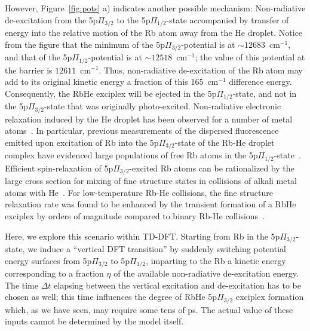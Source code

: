 However, Figure~\ref{fig:pots} a) indicates another possible mechanism: Non-radiative de-excitation from the 5p$\Pi_{3/2}$ to the 5p$\Pi_{1/2}$-state accompanied by transfer of energy into the relative motion of the Rb atom away from the He droplet. Notice from the figure that the minimum of the 5p$\Pi_{3/2}$-potential is at $\sim 12683$~cm$^{-1}$, and that of the 5p$\Pi_{1/2}$-potential is at $\sim 12518$~cm$^{-1}$; the value of this potential at the barrier is $12611$~cm$^{-1}$. Thus, non-radiative de-excitation of the Rb atom may add to its original kinetic energy a fraction of this 165~cm$^{-1}$ difference energy. Consequently, the RbHe exciplex will be ejected in the 5p$\Pi_{1/2}$-state, and not in the 5p$\Pi_{3/2}$-state that was originally photo-excited. Non-radiative electronic relaxation induced by the He droplet has been observed for a number of metal atoms~\cite{Loginov:2007,Fechner:2012,Kautsch:2013,Koch:2014,Lindebner:2014,Loginov:2014,Loginov:2015}. In particular, previous measurements of the dispersed fluorescence emitted upon excitation of Rb into the 5p$\Pi_{3/2}$-state of the Rb-He droplet complex have evidenced large populations of free Rb atoms in the 5p$\Pi_{1/2}$-state~\cite{Bruehl:2001}. Efficient spin-relaxation of 5p$\Pi_{3/2}$-excited Rb atoms can be rationalized by the large cross section for mixing of fine structure states in collisions of alkali metal atoms with He~\cite{Krause:1975}. For low-temperature Rb-He collisions, the fine structure relaxation rate was found to be enhanced by the transient formation of a RbHe exciplex by orders of magnitude compared to binary Rb-He collisions~\cite{Hirano:2003}.

Here, we explore this scenario within TD-DFT. Starting from Rb in the 5p$\Pi_{3/2}$-state, we induce a ``vertical DFT transition'' by suddenly switching potential energy surfaces from 5p$\Pi_{3/2}$ to 5p$\Pi_{1/2}$, imparting to the Rb a kinetic energy corresponding to a fraction $\eta$ of the available non-radiative de-excitation energy. The time $\Delta t$ elapsing between the vertical excitation and de-excitation has to be chosen as well; this time influences the degree of RbHe 5p$\Pi_{3/2}$ exciplex formation which, as we have seen, may require some tens of ps. The actual value of these inputs cannot be determined by the model itself.

